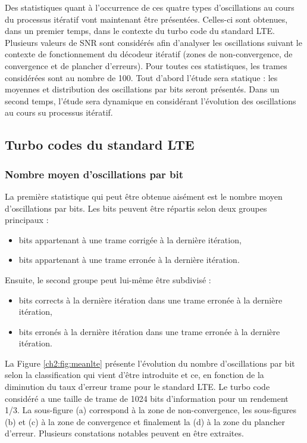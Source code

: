 Des statistiques quant à l’occurrence de ces quatre types d'oscillations au cours du processus itératif vont maintenant être 
présentées. Celles-ci sont obtenues, dans un premier temps, dans le contexte du turbo code du standard LTE.
Plusieurs valeurs de SNR sont considérés afin d'analyser les oscillations suivant le contexte de fonctionnement du 
décodeur itératif (zones de non-convergence, de convergence et de plancher d'erreurs). Pour toutes ces statistiques, les 
trames considérées sont au nombre de 100. Tout d'abord l'étude sera statique : les moyennes et distribution des 
oscillations par bits seront présentés. Dans un second temps, l'étude sera dynamique en considérant l'évolution des 
oscillations au cours su processus itératif.

\subsection{Turbo codes du standard LTE}
\subsubsection{Nombre moyen d'oscillations par bit}
La première statistique qui peut être obtenue aisément est le nombre moyen d'oscillations par bits. Les bits peuvent être 
répartis selon deux groupes principaux :
\begin{itemize}
	\item bits appartenant à une trame corrigée à la dernière itération,
	\item bits appartenant à une trame erronée à la dernière itération.\newline
\end{itemize}
Ensuite, le second groupe peut lui-même être subdivisé :
\begin{itemize}
	\item bits corrects à la dernière itération dans une trame erronée à la dernière itération,
	\item bits erronés à la dernière itération dans une trame erronée à la dernière itération. \newline
\end{itemize}
La Figure \ref{ch2:fig:meanlte} présente l'évolution du nombre d'oscillations par bit selon la classification qui 
vient d'être introduite et ce, en fonction de la diminution du taux d'erreur trame pour le standard LTE. Le turbo code 
considéré a une taille de trame de 1024 bits d'information pour un rendement 1/3. La sous-figure 
(a) correspond à la zone de non-convergence, les sous-figures (b) et (c) à la zone de convergence et finalement la (d) à 
la zone du plancher d'erreur. Plusieurs constations notables peuvent en être extraites. 

